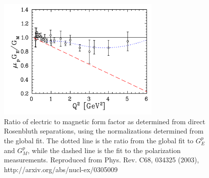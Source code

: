 \documentclass[11pt]{article}
\begin{document}
%
\begin{figure}[!h]
  \begin{center}
    \includegraphics[width=8cm]{Fig6_refjohna.pdf}
    \caption{Ratio of electric to magnetic form factor as determined from direct Rosenbluth separations, using the normalizations determined from the global fit. %
      The dotted line is the ratio from the global fit to $G_E^p$ and $G_M^p$, while the dashed line is the fit to the polarization measurements.
    Reproduced from Phys. Rev. C68, 034325 (2003), http://arxiv.org/abs/nucl-ex/0305009}
    \label{fig6refjohna}
  \end{center}
\end{figure}
%
%
\end{document}
